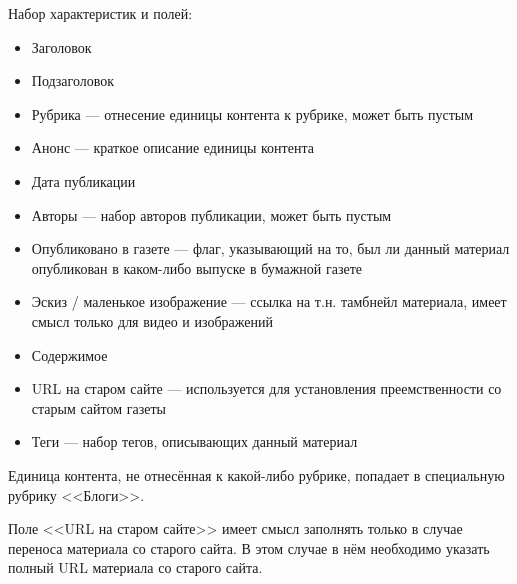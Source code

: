         Набор характеристик и полей:
        \begin{itemize}
            \item Заголовок
            \item Подзаголовок
            \item Рубрика --- отнесение единицы контента к рубрике, может быть пустым
            \item Анонс --- краткое описание единицы контента
            \item Дата публикации
            \item Авторы --- набор авторов публикации, может быть пустым
            \item Опубликовано в газете --- флаг, указывающий на то, был ли данный материал опубликован в каком-либо выпуске в бумажной газете
            \item Эскиз / маленькое изображение --- ссылка на т.н. тамбнейл материала, имеет смысл только для видео и изображений
            \item Содержимое
            \item URL на старом сайте --- используется для установления преемственности со старым сайтом газеты
            \item Теги --- набор тегов, описывающих данный материал
        \end{itemize}
        
        Единица контента, не отнесённая к какой-либо рубрике, попадает в специальную рубрику <<Блоги>>.
        
        Поле <<URL на старом сайте>> имеет смысл заполнять только в случае переноса материала со старого сайта. В этом случае в нём необходимо указать
        полный URL материала со старого сайта.

